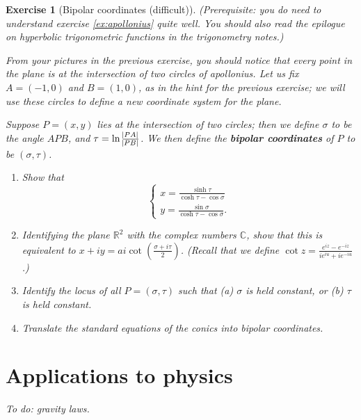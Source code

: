 \documentclass[a4paper,leqno,9pt]{article}
\theoremstyle{exercise}
\newtheorem{exercise}{Exercise}
\theoremstyle{plain}
\theoremstyle{definition}
\theoremstyle{remark}
\newcommand{\df}[1]{\textbf{#1}}
\begin{document}
\begin{exercise}[Bipolar coordinates (difficult)]
  (Prerequisite: you do need to understand exercise \ref{ex:apollonius} quite well. You should also read the epilogue on hyperbolic trigonometric
  functions in the trigonometry notes.)

  From your pictures in the previous exercise, you should notice that every point in the plane is at the intersection of two circles of apollonius.
  Let us fix $ A = (-1, 0) $ and $ B = (1,0) $, as in the hint for the previous exercise; we will use these circles to define a new coordinate system
  for the plane.

  Suppose $ P = (x,y) $ lies at the intersection of two circles; then we define $ \sigma $ to be the angle $ APB $, and $ \tau = \ln \frac{\abs{PA}}{\abs{PB}} $.
  We then define the \df{bipolar coordinates} of $ P $ to be $ (\sigma, \tau) $.
  \begin{enumerate}
    \item Show that
          \begin{displaymath}
            \begin{cases}
              x = \frac{\sinh \tau}{\cosh \tau - \cos \sigma}\\
              y = \frac{\sin \sigma}{\cosh \tau - \cos \sigma}.
            \end{cases}
          \end{displaymath}
    \item Identifying the plane $ \mathbb{R}^2 $ with the complex numbers $ \mathbb{C} $, show that this is
          equivalent to $ x + iy = ai \cot \left(\frac{\sigma + i\tau}{2}\right) $. (Recall that we define $ \cot z = \frac{e^{iz} - e^{-iz}}{ie^{iu} + ie^{-iu}} $.)
    \item Identify the locus of all $ P = (\sigma, \tau) $ such that (a) $ \sigma $ is held constant, or (b) $ \tau $ is held constant.
    \item Translate the standard equations of the conics into bipolar coordinates.
  \end{enumerate}
\end{exercise}

\section{Applications to physics}
\emph{To do: gravity laws.}
\end{document}
